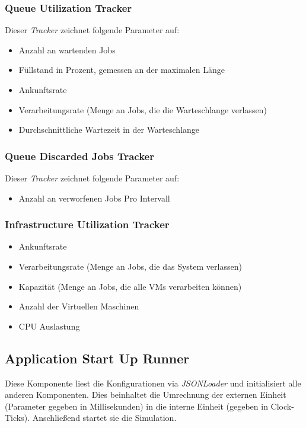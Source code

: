 \subsubsection{Queue Utilization Tracker}
Dieser \textit{Tracker} zeichnet folgende Parameter auf:
\begin{itemize}
	\item Anzahl an wartenden Jobs 
	\item Füllstand in Prozent, gemessen an der maximalen Länge
	\item Ankunftsrate
	\item Verarbeitungsrate (Menge an Jobs, die die  Warteschlange verlassen)
	\item Durchschnittliche Wartezeit in der Warteschlange
\end{itemize}

\subsubsection{Queue Discarded Jobs Tracker}
Dieser \textit{Tracker} zeichnet folgende Parameter auf:
\begin{itemize}
	\item Anzahl an verworfenen Jobs Pro Intervall
\end{itemize}

\subsubsection{Infrastructure Utilization Tracker}
\begin{itemize}
	\item Ankunftsrate
	\item Verarbeitungsrate (Menge an Jobs, die das System verlassen)
	\item Kapazität (Menge an Jobs, die alle VMs verarbeiten können)
	\item Anzahl der Virtuellen Maschinen
	\item CPU Auslastung
\end{itemize}

\subsection{Application Start Up Runner}
Diese Komponente liest die Konfigurationen via \textit{JSONLoader} und initialisiert alle anderen Komponenten. Dies beinhaltet die Umrechnung der externen Einheit (Parameter gegeben in Millisekunden) in die interne Einheit (gegeben in Clock-Ticks). Anschließend startet sie die Simulation.

